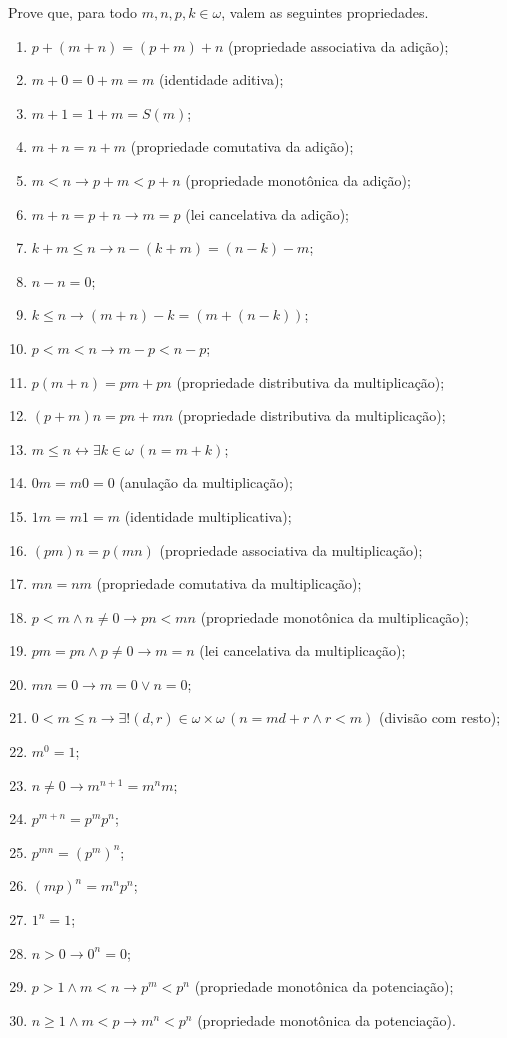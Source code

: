 \begin{exercise}\label{exr:propriedadesDasOperacoesAritmeticas}
    Prove que, para todo $m, n, p, k \in \omega$, valem as seguintes propriedades.
    \begin{enumerate}[label=(\roman*)]
        \item $p+(m+n)=(p+m)+n$ (propriedade associativa da adição);
        \item $m+0=0+m=m$ (identidade aditiva);
        \item $m+1=1+m=S(m)$;
        \item $m+n=n+m$ (propriedade comutativa da adição);
        \item $m<n\rightarrow p+m<p+n$ (propriedade monotônica da adição);
        \item $m+n=p+n\rightarrow m=p$ (lei cancelativa da adição);
        \item $k+m\leq n\rightarrow n-(k+m)=(n-k)-m$;
        \item $n-n=0$;
        \item $k\leq n\rightarrow (m+n)-k=(m+(n-k))$;
        \item $p<m<n\rightarrow m-p<n-p$;
        \item $p(m+n)=pm+pn$ (propriedade distributiva da multiplicação);
        \item $(p+m)n=pn+mn$ (propriedade distributiva da multiplicação);
        \item $m\leq n \leftrightarrow \exists k\in \omega\, (n=m+k)$;
        \item $0m=m0=0$ (anulação da multiplicação);
        \item $1m=m1=m$ (identidade multiplicativa);
        \item $(pm)n=p(mn)$ (propriedade associativa da multiplicação);
        \item $mn=nm$ (propriedade comutativa da multiplicação);
        \item $p<m \land n\neq 0 \rightarrow pn<mn$ (propriedade monotônica da multiplicação);
        \item $pm=pn \land p\neq 0 \rightarrow m=n$ (lei cancelativa da multiplicação);
        \item $mn=0 \rightarrow m=0 \vee n=0$;
        \item $0<m\leq n \rightarrow \exists!(d, r)\in \omega\times \omega\, (n=md+r \land r<m)$ (divisão com resto);
        \item $m^0=1$;
        \item $n\neq 0 \rightarrow m^{n+1}=m^nm$;
        \item $p^{m+n}=p^mp^n$;
        \item $p^{mn}=(p^m)^n$;
        \item $(mp)^n=m^np^n$;
        \item $1^n=1$;
        \item $n>0 \rightarrow 0^n=0$;
        \item $p>1 \land m<n \rightarrow p^m<p^n$ (propriedade monotônica da potenciação);
        \item $n\geq 1 \land m<p \rightarrow m^n<p^n$ (propriedade monotônica da potenciação).
    \end{enumerate}
\end{exercise}

